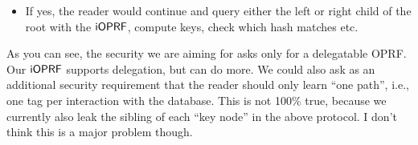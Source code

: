 {\begin{itemize}
\begin{itemize}
\begin{itemize}
\item If yes, the reader would continue and query either the left or right child of the root with the $\mathsf{i}\mathsf{OPRF}$, compute keys, check which hash matches etc.
\end{itemize}
  \end{itemize}
\end{itemize}

As you can see, the security we are aiming for asks only for a
delegatable OPRF. Our $\mathsf{i}\mathsf{OPRF}$ supports delegation, but can do more. We
could also ask as an additional security requirement that the reader
should only learn ``one path'', i.e., one tag per interaction with the
database. This is not 100\% true, because we currently also leak the
sibling of each ``key node'' in the above protocol. I don't think this
is a major problem though.
}%
